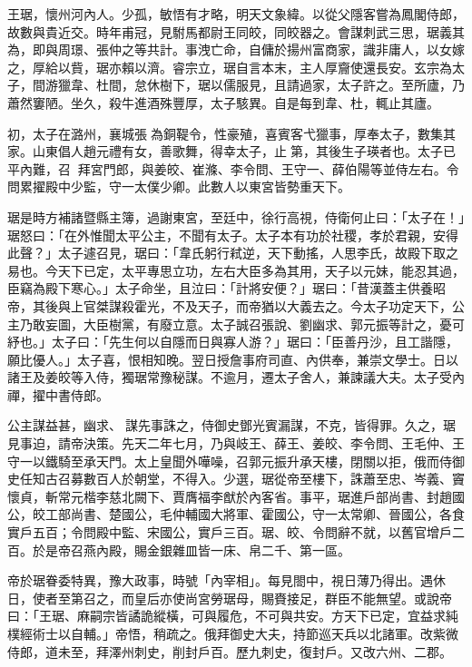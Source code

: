 \begin{pinyinscope}
 王琚，懷州河內人。少孤，敏悟有才略，明天文象緯。以從父隱客嘗為鳳閣侍郎，故數與貴近交。時年甫冠，見駙馬都尉王同皎，同皎器之。會謀刺武三思，琚義其為，即與周璟、張仲之等共計。事洩亡命，自傭於揚州富商家，識非庸人，以女嫁之，厚給以貲，琚亦賴以濟。睿宗立，琚自言本末，主人厚齎使還長安。玄宗為太子，間游獵韋、杜間，怠休樹下，琚以儒服見，且請過家，太子許之。至所廬，乃蕭然窶陋。坐久，殺牛進酒殊豐厚，太子駭異。自是每到韋、杜，輒止其廬。



 初，太子在潞州，襄城張為銅鞮令，性豪殖，喜賓客弋獵事，厚奉太子，數集其家。山東倡人趙元禮有女，善歌舞，得幸太子，止第，其後生子瑛者也。太子已平內難，召，拜宮門郎，與姜皎、崔滌、李令問、王守一、薛伯陽等並侍左右。令問累擢殿中少監，守一太僕少卿。此數人以東宮皆勢重天下。



 琚是時方補諸暨縣主簿，過謝東宮，至廷中，徐行高視，侍衛何止曰：「太子在！」琚怒曰：「在外惟聞太平公主，不聞有太子。太子本有功於社稷，孝於君親，安得此聲？」太子遽召見，琚曰：「韋氏躬行弒逆，天下動搖，人思李氏，故殿下取之易也。今天下已定，太平專思立功，左右大臣多為其用，天子以元妹，能忍其過，臣竊為殿下寒心。」太子命坐，且泣曰：「計將安便？」琚曰：「昔漢蓋主供養昭帝，其後與上官桀謀殺霍光，不及天子，而帝猶以大義去之。今太子功定天下，公主乃敢妄圖，大臣樹黨，有廢立意。太子誠召張說、劉幽求、郭元振等計之，憂可紓也。」太子曰：「先生何以自隱而日與寡人游？」琚曰：「臣善丹沙，且工諧隱，願比優人。」太子喜，恨相知晚。翌日授詹事府司直、內供奉，兼崇文學士。日以諸王及姜皎等入侍，獨琚常豫秘謀。不逾月，遷太子舍人，兼諫議大夫。太子受內禪，擢中書侍郎。



 公主謀益甚，幽求、謀先事誅之，侍御史鄧光賓漏謀，不克，皆得罪。久之，琚見事迫，請帝決策。先天二年七月，乃與岐王、薛王、姜皎、李令問、王毛仲、王守一以鐵騎至承天門。太上皇聞外嘩噪，召郭元振升承天樓，閉關以拒，俄而侍御史任知古召募數百人於朝堂，不得入。少選，琚從帝至樓下，誅蕭至忠、岑義、竇懷貞，斬常元楷李慈北闕下、賈膺福李猷於內客省。事平，琚進戶部尚書、封趙國公，皎工部尚書、楚國公，毛仲輔國大將軍、霍國公，守一太常卿、晉國公，各食實戶五百；令問殿中監、宋國公，實戶三百。琚、皎、令問辭不就，以舊官增戶二百。於是帝召燕內殿，賜金銀雜皿皆一床、帛二千、第一區。



 帝於琚眷委特異，豫大政事，時號「內宰相」。每見閤中，視日薄乃得出。遇休日，使者至第召之，而皇后亦使尚宮勞琚母，賜賚接足，群臣不能無望。或說帝曰：「王琚、麻嗣宗皆譎詭縱橫，可與履危，不可與共安。方天下已定，宜益求純樸經術士以自輔。」帝悟，稍疏之。俄拜御史大夫，持節巡天兵以北諸軍。改紫微侍郎，道未至，拜澤州刺史，削封戶百。歷九刺史，復封戶。又改六州、二郡。




\end{pinyinscope}
